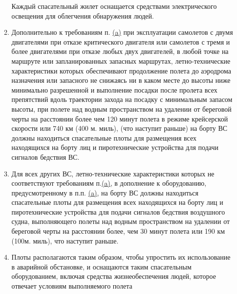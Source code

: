 \begin{enumerate}
\begin{enumerate}
        Каждый спасательный жилет оснащается средствами электрического освещения для облегчения обнаружения людей.
        \item Дополнительно к требованиям п. \hyperref[sec:oneeng]{(a)} при эксплуатации самолетов с двумя двигателями при отказе критического двигателя или самолетов с тремя и более двигателями при отказе любых двух двигателей, в любой точке на маршруте или запланированных запасных маршрутах, летно-технические характеристики которых обеспечивают продолжение полета до аэродрома назначения или запасного не снижаясь ни в каком месте до высоты ниже минимально разрешенной и выполнение посадки после пролета всех препятствий вдоль траектории захода на посадку с минимальным запасом высоты, при полете над водным пространством на удалении от береговой черты на расстоянии более чем 120 минут полета в режиме крейсерской скорости или 740 км (400 м. миль), (что наступит раньше) на борту ВС должны находиться спасательные плоты для размещения всех находящихся на борту лиц и пиротехнические устройства для подачи сигналов бедствия ВС.
        \item Для всех других ВС, летно-технические характеристики которых не соответствуют требованиям п.\hyperref[sec:oneeng]{(a)}, в дополнение к оборудованию, предусмотренному в п.п. \hyperref[sec:oneeng]{(a)}, на борту ВС должны находиться спасательные плоты для размещения всех находящихся на борту лиц и пиротехнические устройства для подачи сигналов бедствия воздушного судна, выполняющего полеты над водным пространством на удалении от береговой черты на расстоянии более, чем 30 минут полета или 190 км (100м. миль), что наступит раньше.
        \item Плоты располагаются таким образом, чтобы упростить их использование в аварийной обстановке, и оснащаются таким спасательным оборудованием, включая средства жизнеобеспечения людей, которое отвечает условиям выполняемого полета
    \end{enumerate}
\end{enumerate}
 
